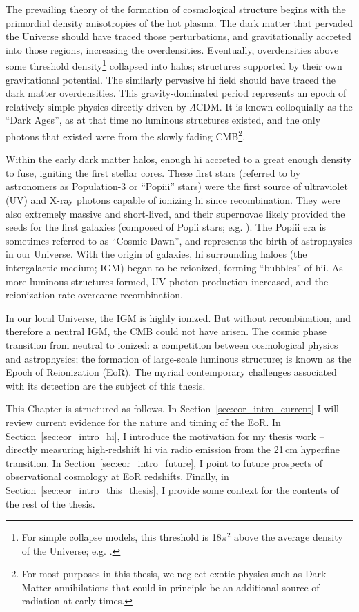 The prevailing theory of the formation of cosmological structure begins with the primordial density anisotropies of the hot plasma. The dark matter that pervaded the Universe should have traced those perturbations, and gravitationally accreted into those regions, increasing the overdensities. Eventually, overdensities above some threshold density\footnote{For simple collapse models, this threshold is 18$\pi^2$ above the average density of the Universe; e.g. \citet{Press.74}.} collapsed into halos; structures supported by their own gravitational potential. The similarly pervasive {\sc hi} field should have traced the dark matter overdensities. This gravity-dominated period represents an epoch of relatively simple physics directly driven by $\Lambda$CDM. It is known colloquially as the ``Dark Ages'', as at that time no luminous structures existed, and the only photons that existed were from the slowly fading CMB\footnote{For most purposes in this thesis, we neglect exotic physics such as Dark Matter annihilations that could in principle be an additional source of radiation at early times.}.

Within the early dark matter halos, enough {\sc hi} accreted to a great enough density to fuse, igniting the first stellar cores. These first stars (referred to by astronomers as Population-3 or ``Pop{\sc iii}'' stars) were the first source of ultraviolet (UV) and X-ray photons capable of ionizing {\sc hi} since recombination. They were also extremely massive and short-lived, and their supernovae likely provided the seeds for the first galaxies (composed of Pop{\sc ii} stars; e.g. \citet{Ricotti.16}). The Pop{\sc iii} era is sometimes referred to as ``Cosmic Dawn'', and represents the birth of astrophysics in our Universe. With the origin of galaxies, {\sc hi} surrounding haloes (the intergalactic medium; IGM) began to be reionized, forming ``bubbles'' of {\sc hii}. As more luminous structures formed, UV photon production increased, and the reionization rate overcame recombination.

In our local Universe, the IGM is highly ionized. But without recombination, and therefore a neutral IGM, the CMB could not have arisen. The cosmic phase transition from neutral to ionized: a competition between cosmological physics and astrophysics; the formation of large-scale luminous structure; is known as the Epoch of Reionization (EoR). The myriad contemporary challenges associated with its detection are the subject of this thesis.

This Chapter is structured as follows. In Section~\ref{sec:eor_intro_current} I will review current evidence for the nature and timing of the EoR. In Section~\ref{sec:eor_intro_hi}, I introduce the motivation for my thesis work -- directly measuring high-redshift {\sc hi} via radio emission from the 21\,cm hyperfine transition. In Section~\ref{sec:eor_intro_future}, I point to future prospects of observational cosmology at EoR redshifts. Finally, in Section~\ref{sec:eor_intro_this_thesis}, I provide some context for the contents of the rest of the thesis.


